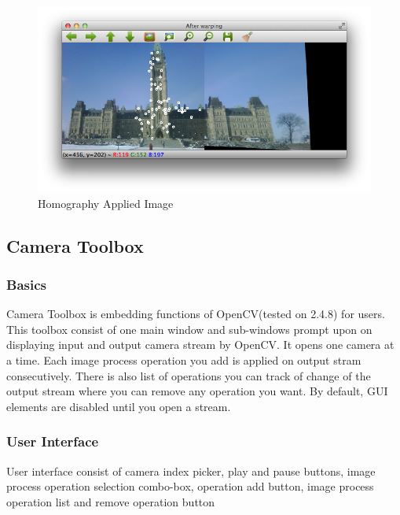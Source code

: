 \documentclass{article}
\begin{document}
\begin{figure}[H]
\begin{center}
\includegraphics[scale=0.4]{toolboxHomography.png}
\caption{Homography Applied Image}
\end{center}
\end{figure}	   

	\subsection{Camera Toolbox}
	\subsubsection{Basics}
	Camera Toolbox is embedding functions of OpenCV(tested on 2.4.8) for users. This toolbox consist of one main window and sub-windows prompt upon on displaying input and output camera stream by OpenCV. It opens one camera at a time. Each image process operation you add is applied on output stram consecutively. There is also list of operations you can track of change of the output stream where you can remove any operation you want. By default, GUI elements are disabled until you open a stream.
	
	\subsubsection{User Interface}
	User interface consist of camera index picker, play and pause buttons, image process operation selection combo-box, operation add button, image process operation list and remove operation button \par
\end{document}
